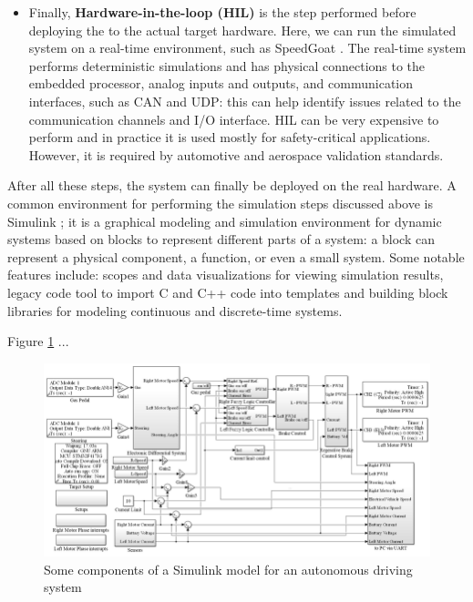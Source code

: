 \begin{itemize}
    \item Finally, \textbf{Hardware-in-the-loop (HIL)} is the step performed before deploying the \es to the actual target hardware. Here, we can run the simulated system on a real-time environment, such as SpeedGoat \cite{SpeedGoat}. The real-time system performs deterministic simulations and has physical connections to the embedded processor, \ie analog inputs and outputs, and communication interfaces, such as CAN and UDP: this can help identify issues related to the communication channels and I/O interface. HIL can be very expensive to perform and in practice it is used mostly for safety-critical applications. However, it is required by automotive and aerospace validation standards. 
\end{itemize}

After all these steps, the system can finally be deployed on the real hardware. A common environment for performing the simulation steps discussed above is Simulink \cite{Simulink}; it is a graphical modeling and simulation environment for dynamic systems based on blocks to represent different parts of a system: a block can represent a physical component, a function, or even a small system. Some notable features include: scopes and data visualizations for viewing simulation results, legacy code tool to import C and C++ code into templates and building block libraries for modeling continuous and discrete-time systems.

Figure \ref{simulink_model} ...

\begin{figure}[H]
    \centering
    \includegraphics[width=\linewidth]{figures/simulink_model.png}
    \caption{Some components of a Simulink model for an autonomous driving system}
    \label{simulink_model}
\end{figure}


